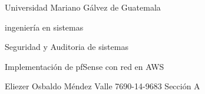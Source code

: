 \documentclass{article} %
\begin{document}


\noindent Universidad Mariano G\'{a}lvez de Guatemala

\noindent ingenier\'{i}a en sistemas

\noindent Seguridad y Auditoria de sistemas

\noindent 

\noindent 

\noindent 

\noindent 

\noindent 

\noindent 

\noindent 

\noindent 

\noindent 

\noindent 

\noindent 

\noindent 

\noindent 

\noindent 

\noindent 

\noindent 

\noindent 

\noindent 

\noindent 

\noindent Implementaci\'{o}n de pfSense con red en AWS

\noindent 

\noindent 

\noindent 

\noindent 

\noindent 

\noindent 

\noindent 

\noindent 

\noindent 

\noindent 

\noindent 

\noindent 

\noindent 

\noindent 

\noindent 

\noindent 

\noindent 

\noindent 

\noindent 

\noindent 

\noindent 

\noindent Eliezer Osbaldo M\'{e}ndez Valle {\textbar} 7690-14-9683 {\textbar} Secci\'{o}n A
\end{document}
